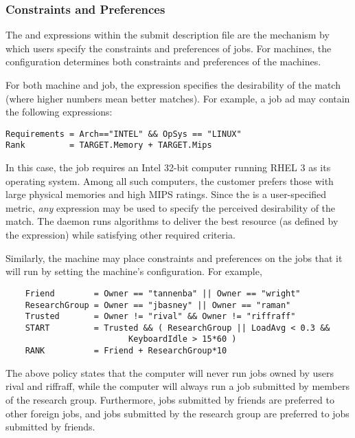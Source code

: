 \subsubsection{Constraints and Preferences}
The  and  expressions
within the submit description file
are the mechanism
by which users specify the constraints and preferences of jobs.
For machines, the configuration determines both 
constraints and preferences of the machines.

For both machine and job, 
the  expression specifies
the desirability of the match (where higher numbers mean better matches).
For example, a job ad may contain the following expressions:
\footnotesize
\begin{verbatim}
Requirements = Arch=="INTEL" && OpSys == "LINUX"
Rank         = TARGET.Memory + TARGET.Mips
\end{verbatim}
\normalsize
In this case, the job requires an Intel 32-bit computer running RHEL 3
as its operating system.
Among all such computers,
the customer prefers those with large physical memories and high MIPS ratings.  
Since the  is a user-specified metric,
\emph{any} expression may be used to specify the
perceived desirability of the match.
The  daemon runs algorithms
to deliver the best resource (as defined by the  expression)
while satisfying other required criteria.

Similarly, the machine may place constraints and preferences on 
the jobs that it will run by setting the machine's configuration.
For example,
\footnotesize
\begin{verbatim}
    Friend        = Owner == "tannenba" || Owner == "wright"
    ResearchGroup = Owner == "jbasney" || Owner == "raman"
    Trusted       = Owner != "rival" && Owner != "riffraff"
    START         = Trusted && ( ResearchGroup || LoadAvg < 0.3 &&
                         KeyboardIdle > 15*60 )
    RANK          = Friend + ResearchGroup*10
\end{verbatim}
\normalsize

The above policy states that the computer will never run jobs owned by
users rival and riffraff, while the computer will always run a 
job submitted by members of the research group.
Furthermore,
jobs submitted by friends are preferred to other foreign jobs,
and jobs submitted
by the research group are preferred to jobs submitted by friends. 

